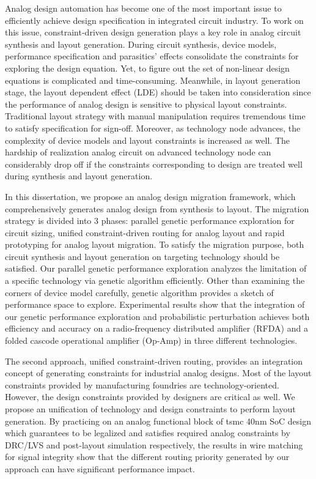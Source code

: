 
Analog design automation has become one of the most important issue to efficiently achieve design specification in integrated circuit industry. To work on this issue, constraint-driven design generation plays a key role in analog circuit synthesis and layout generation. During circuit synthesis, device models, performance specification and parasitics' effects consolidate the constraints for exploring the design equation. Yet, to figure out the set of non-linear design equations is complicated and time-consuming. Meanwhile, in layout generation stage, the layout dependent effect (LDE) should be taken into consideration since the performance of analog design is sensitive to physical layout constraints. Traditional layout strategy with manual manipulation requires tremendous time to satisfy specification for sign-off. Moreover, as technology node advances, the complexity of device models and layout constraints is increased as well. The hardship of realization analog circuit on advanced technology node can considerably drop off if the constraints corresponding to design are treated well during synthesis and layout generation.

In this dissertation, we propose an analog design migration framework, which comprehensively generates analog design from synthesis to layout. The migration strategy is divided into 3 phases: parallel genetic performance exploration for circuit sizing, unified constraint-driven routing for analog layout and rapid prototyping for analog layout migration. To satisfy the migration purpose, both circuit synthesis and layout generation on targeting technology should be satisfied. Our parallel genetic performance exploration analyzes the limitation of a specific technology via genetic algorithm efficiently. Other than examining the corners of device model carefully, genetic algorithm provides a sketch of performance space to explore. Experimental results show that the integration of our genetic performance exploration and probabilistic perturbation achieves both efficiency and accuracy on a radio-frequency distributed amplifier (RFDA) and a folded cascode operational amplifier (Op-Amp) in three different technologies.

The second approach, unified constraint-driven routing, provides an integration concept of generating constraints for industrial analog designs. Most of the layout constraints provided by manufacturing foundries are technology-oriented. However, the design constraints provided by designers are critical as well. We propose an unification of technology and design constraints to perform layout generation. By practicing on an analog functional block of tsmc 40nm SoC design which guarantees to be legalized and satisfies required analog constraints by DRC/LVS and post-layout simulation respectively, the results in wire matching for signal integrity show that the different routing priority generated by our approach can have significant performance impact.

